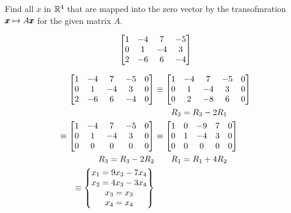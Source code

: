 \documentclass{../mathhomework}
\newenvironment{Mat}{\begin{bmatrix}}{\end{bmatrix}}
\begin{document}
\begin{problem}[1.8\#9]
    Find all $x$ in $\mathbb{R}^4$ that are mapped into the zero vector by the transofmration $\pmb{x} \mapsto A\pmb{x}$ for the given matrix $A$.
    
    \begin{equation*}
        \begin{Mat}
            1 & -4 & 7 & -5 \\
            0 & 1 & -4 & 3 \\
            2 & -6 & 6 & -4
        \end{Mat}
    \end{equation*}

    \begin{solution}
        \begin{align*}
            \begin{Mat}
                1 & -4 & 7 & -5 & 0 \\
                0 & 1 & -4 & 3 & 0 \\
                2 & -6 & 6 & -4 & 0
            \end{Mat}
            & \equiv \begin{Mat}
                1 & -4 & 7 & -5 & 0 \\
                0 & 1 & -4 & 3 & 0 \\
                0 & 2 & -8 & 6 & 0
            \end{Mat}
            \\ 
            & \qquad{} R_3 = R_3 - 2R_1 \\
            \equiv \begin{Mat}
                1 & -4 & 7 & -5 & 0 \\
                0 & 1 & -4 & 3 & 0 \\
                0 & 0 & 0 & 0 & 0
            \end{Mat}
            & \equiv \begin{Mat}
                1 & 0 & -9 & 7 & 0 \\
                0 & 1 & -4 & 3 & 0 \\
                0 & 0 & 0 & 0 & 0
            \end{Mat}
            \\ R_3 = R_3 - 2R_2 & \qquad{} R_1 = R_1 + 4R_2 \\
            \equiv \begin{Bmatrix}
                x_1 = 9x_3 - 7x_4 \\ 
                x_2 = 4x_3 - 3x_4 \\ 
                x_3 = x_3 \\ 
                x_4 = x_4
            \end{Bmatrix}
        \end{align*}


\end{solution}
\end{problem}
\end{document}
